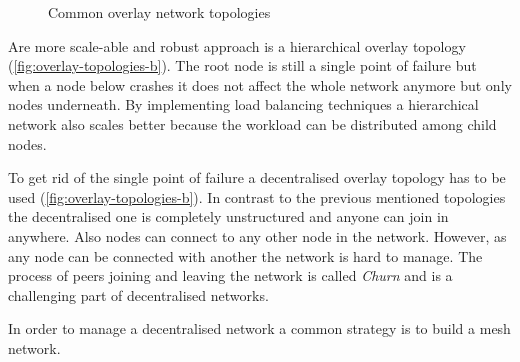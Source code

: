 \begin{figure}[htb!]
  \centering
	\caption{Common overlay network topologies}
\label{fig:overlay-topologies}
\end{figure}

Are more scale-able and robust approach is a hierarchical overlay topology (\cref{fig:overlay-topologies-b}). The root node is still a single point of failure but when a node below crashes it does not affect the whole network anymore but only nodes underneath. By implementing load balancing techniques a hierarchical network also scales better because the workload can be distributed among child nodes.

To get rid of the single point of failure a decentralised overlay topology has to be used (\cref{fig:overlay-topologies-b}). In contrast to the previous mentioned topologies the decentralised one is completely unstructured and anyone can join in anywhere. Also nodes can connect to any other node in the network. However, as any node can be connected with another the network is hard to manage. The process of peers joining and leaving the network is called \textit{Churn} \cite[\S1]{stutzbach_rejaie_2006} and is a challenging part of decentralised networks.

In order to manage a decentralised network a common strategy is to build a mesh network.
